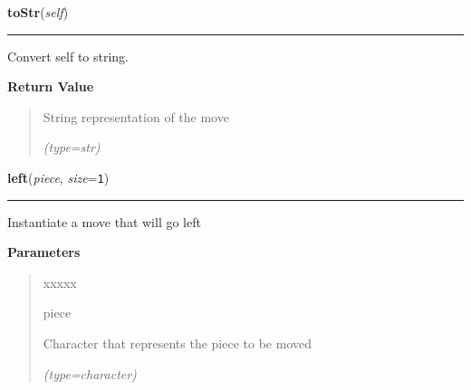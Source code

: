     \label{UnBlockMeSolver:Map:Move:Move:toStr}

    \vspace{0.5ex}

\hspace{.8\funcindent}\begin{boxedminipage}{\funcwidth}

    \raggedright \textbf{toStr}(\textit{self})

    \vspace{-1.5ex}

    \rule{\textwidth}{0.5\fboxrule}
\setlength{\parskip}{2ex}
    Convert self to string.

\setlength{\parskip}{1ex}
      \textbf{Return Value}
    \vspace{-1ex}

      \begin{quote}
      String representation of the move

      {\it (type=str)}

      \end{quote}

    \end{boxedminipage}

    \label{UnBlockMeSolver:Map:Move:Move:left}

    \vspace{0.5ex}

\hspace{.8\funcindent}\begin{boxedminipage}{\funcwidth}

    \raggedright \textbf{left}(\textit{piece}, \textit{size}={\tt 1})

    \vspace{-1.5ex}

    \rule{\textwidth}{0.5\fboxrule}
\setlength{\parskip}{2ex}
    Instantiate a move that will go left

\setlength{\parskip}{1ex}
      \textbf{Parameters}
      \vspace{-1ex}

      \begin{quote}
        \begin{Ventry}{xxxxx}

          \item[piece]

          Character that represents the piece to be moved

            {\it (type=character)}

        \end{Ventry}

      \end{quote}

    \end{boxedminipage}

